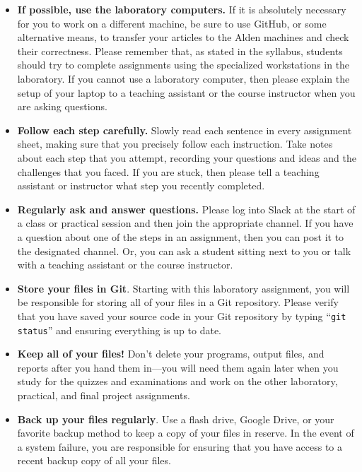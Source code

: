 \vspace*{-.1in}
\begin{itemize}
  \setlength{\itemsep}{-.01in}

\item {\bf If possible, use the laboratory computers.} If it is absolutely necessary for you to work on a different
  machine, be sure to use GitHub, or some alternative means, to transfer your articles to the Alden machines and check
  their correctness. Please remember that, as stated in the syllabus, students should try to complete assignments using
  the specialized workstations in the laboratory. If you cannot use a laboratory computer, then please explain the setup
  of your laptop to a teaching assistant or the course instructor when you are asking questions.

\item {\bf Follow each step carefully.} Slowly read each sentence in every assignment sheet, making sure that you
  precisely follow each instruction. Take notes about each step that you attempt, recording your questions and ideas
  and the challenges that you faced. If you are stuck, then please tell a teaching assistant or instructor what step
  you recently completed.

\item {\bf Regularly ask and answer questions.} Please log into Slack at the start of a class or practical session and
  then join the appropriate channel. If you have a question about one of the steps in an assignment, then you can post
  it to the designated channel. Or, you can ask a student sitting next to you or talk with a teaching assistant or the
  course instructor.

\item {\bf Store your files in Git}. Starting with this laboratory assignment, you will be responsible for storing all
  of your files in a Git repository. Please verify that you have saved your source code in your Git repository by
  typing ``{\tt git status}'' and ensuring everything is up to date.

\item {\bf Keep all of your files!} Don't delete your programs, output files, and reports after you hand them in---you
  will need them again later when you study for the quizzes and examinations and work on the other laboratory,
  practical, and final project assignments.

\item {\bf Back up your files regularly}. Use a flash drive, Google Drive, or your favorite backup method to keep a
  copy of your files in reserve. In the event of a system failure, you are responsible for ensuring that you have
  access to a recent backup copy of all your files.

\end{itemize}

